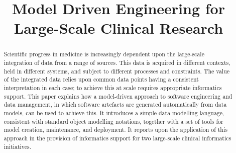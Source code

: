 \documentclass[conference]{IEEEtran}
\begin{document}
 

 
\title{Model Driven Engineering for \\ Large-Scale Clinical Research}
 

\vskip 4mm 

\author{%
}

\ifpdf
\graphicspath{{ASEFigs/}}
\fi

\maketitle

\begin{abstract}
 
  Scientific progress in medicine is increasingly dependent upon the
  large-scale integration of data from a range of sources.  This data
  is acquired in different contexts, held in different systems, and
  subject to different processes and constraints.  The value of the
  integrated data relies upon common data points having a consistent
  interpretation in each case; to achieve this at scale requires
  appropriate informatics support.  This paper explains how a
  model-driven approach to software engineering and data management,
  in which software artefacts are generated automatically from data
  models, can be used to achieve this.  It introduces a simple data
  modelling language, consistent with standard object modelling
  notations, together with a set of tools for model creation,
  maintenance, and deployment.  It reports upon the application of
  this approach in the provision of informatics support for two
  large-scale clinical informatics initiatives.
 
\end{abstract}

% 


\vskip 14mm

\noindent






 


\newpage




\end{document}
